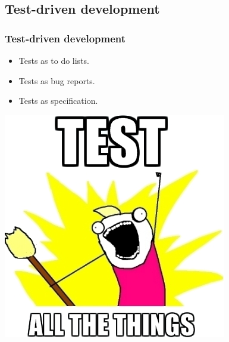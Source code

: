 \documentclass[12pt,compress,english,utf8,t]{beamer}
\begin{document}
\subsection{Test-driven development}

\begin{frame}\frametitle{Test-driven development}
  \begin{itemize}
    \item Tests as to do lists.
    \item Tests as bug reports.
    \item Tests as specification.
  \end{itemize}

  \begin{center}
    \includegraphics[scale=0.5]{images/test-all-the-things.jpeg}
  \end{center}
\end{frame}
\end{document}
